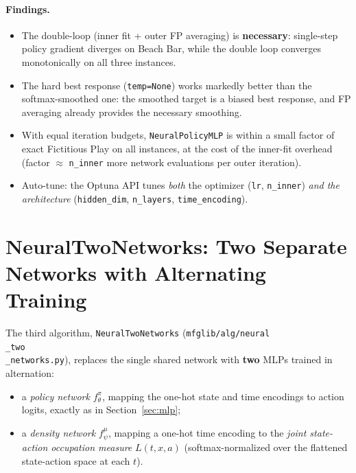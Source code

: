 \documentclass[11pt,a4paper]{article}
\begin{document}
\paragraph{Findings.}
\begin{itemize}
  \item The double-loop (inner fit + outer FP averaging) is \textbf{necessary}:
    single-step policy gradient diverges on Beach Bar, while the double loop
    converges monotonically on all three instances.
  \item The hard best response (\texttt{temp=None}) works markedly better
    than the softmax-smoothed one: the smoothed target is a biased best
    response, and FP averaging already provides the necessary smoothing.
  \item With equal iteration budgets, \texttt{NeuralPolicyMLP} is within a
    small factor of exact Fictitious Play on all instances, at the cost of
    the inner-fit overhead (factor $\approx$ \texttt{n\_inner} more network
    evaluations per outer iteration).
  \item Auto-tune: the Optuna API tunes \emph{both} the optimizer
    (\texttt{lr}, \texttt{n\_inner}) \emph{and the architecture}
    (\texttt{hidden\_dim}, \texttt{n\_layers}, \texttt{time\_encoding}).
\end{itemize}



\section{NeuralTwoNetworks: Two Separate Networks with Alternating Training}\label{sec:twonets}

The third algorithm, \texttt{NeuralTwoNetworks}
(\texttt{mfglib/alg/neural\\_two\\_networks.py}), replaces the single shared
network with \textbf{two} MLPs trained in alternation:

\begin{itemize}
  \item a \emph{policy network} $f^\pi_\theta$, mapping the one-hot state and
        time encodings to action logits, exactly as in
        Section~\ref{sec:mlp};
  \item a \emph{density network} $f^\mu_\psi$, mapping a one-hot time
        encoding to the \emph{joint state-action occupation measure}
        $L(t, x, a)$ (softmax-normalized over the flattened state-action
        space at each $t$).
\end{itemize}
\end{document}
